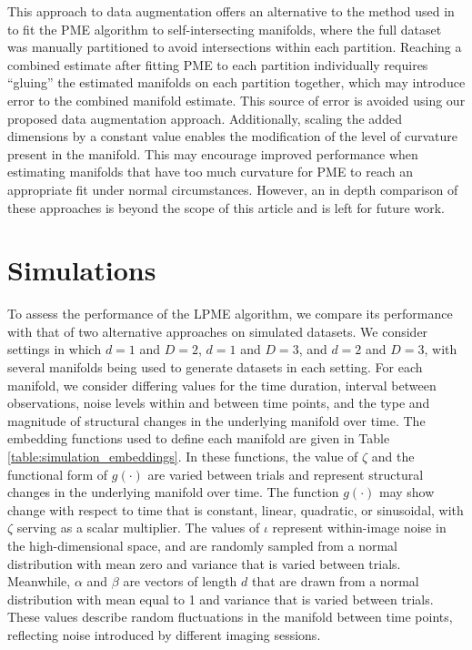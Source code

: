 \documentclass[11pt,reqno]{article}
\theoremstyle{definition}
\begin{document}
This approach to data augmentation offers an alternative to the method used in \cite{mengPrincipalManifoldEstimation2021} to fit the PME algorithm to self-intersecting manifolds, where the full dataset was manually partitioned to avoid intersections within each partition. Reaching a combined estimate after fitting PME to each partition individually requires ``gluing'' the estimated manifolds on each partition together, which may introduce error to the combined manifold estimate. This source of error is avoided using our proposed data augmentation approach. Additionally, scaling the added dimensions by a constant value enables the modification of the level of curvature present in the manifold. This may encourage improved performance when estimating manifolds that have too much curvature for PME to reach an appropriate fit under normal circumstances. However, an in depth comparison of these approaches is beyond the scope of this article and is left for future work.





\section{Simulations}\label{s:simulations}

To assess the performance of the LPME algorithm, we compare its performance with that of two alternative approaches on simulated datasets. We consider settings in which $d = 1$ and $D = 2$, $d = 1$ and $D = 3$, and $d = 2$ and $D = 3$, with several manifolds being used to generate datasets in each setting. For each manifold, we consider differing values for the time duration, interval between observations, noise levels within and between time points, and the type and magnitude of structural changes in the underlying manifold over time. The embedding functions used to define each manifold are given in Table \ref{table:simulation_embeddings}. In these functions, the value of $\zeta$ and the functional form of $g(\cdot)$ are varied between trials and represent structural changes in the underlying manifold over time. The function $g(\cdot)$ may show change with respect to time that is constant, linear, quadratic, or sinusoidal, with $\zeta$ serving as a scalar multiplier. The values of $\iota$ represent within-image noise in the high-dimensional space, and are randomly sampled from a normal distribution with mean zero and variance that is varied between trials. Meanwhile, $\alpha$ and $\beta$ are vectors of length $d$ that are drawn from a normal distribution with mean equal to 1 and variance that is varied between trials. These values describe random fluctuations in the manifold between time points, reflecting noise introduced by different imaging sessions.
\end{document}
